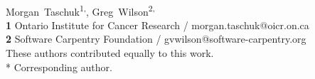 \documentclass[10pt,letterpaper]{article}
\date{}
\begin{document}
\vspace*{0.2in}


\begin{flushleft}
{\Large
\textbf{}
}
\newline
\\
{Morgan~Taschuk}\textsuperscript{1,\ddag *},
{Greg~Wilson}\textsuperscript{2,\ddag}
\\
\textbf{1} Ontario Institute for Cancer Research / morgan.taschuk@oicr.on.ca
\\
\textbf{2} Software Carpentry Foundation / gvwilson@software-carpentry.org
\\
\bigskip
{\ddag} These authors contributed equally to this work.
\\
* Corresponding author.
\end{flushleft}
\end{document}
